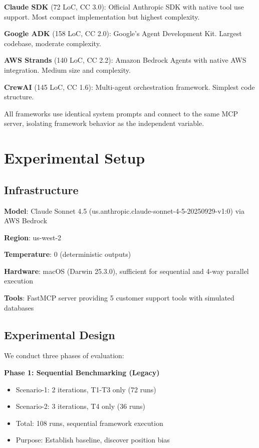 \documentclass[sigconf,nonacm]{acmart}
\begin{document}
\textbf{Claude SDK} (72 LoC, CC 3.0): Official Anthropic SDK with native tool use support. Most compact implementation but highest complexity.

\textbf{Google ADK} (158 LoC, CC 2.0): Google's Agent Development Kit. Largest codebase, moderate complexity.

\textbf{AWS Strands} (140 LoC, CC 2.2): Amazon Bedrock Agents with native AWS integration. Medium size and complexity.

\textbf{CrewAI} (145 LoC, CC 1.6): Multi-agent orchestration framework. Simplest code structure.

All frameworks use identical system prompts and connect to the same MCP server, isolating framework behavior as the independent variable.

\section{Experimental Setup}

\subsection{Infrastructure}

\textbf{Model}: Claude Sonnet 4.5 (us.anthropic.claude-sonnet-4-5-20250929-v1:0) via AWS Bedrock

\textbf{Region}: us-west-2

\textbf{Temperature}: 0 (deterministic outputs)

\textbf{Hardware}: macOS (Darwin 25.3.0), sufficient for sequential and 4-way parallel execution

\textbf{Tools}: FastMCP server providing 5 customer support tools with simulated databases

\subsection{Experimental Design}

We conduct three phases of evaluation:

\textbf{Phase 1: Sequential Benchmarking (Legacy)}
\begin{itemize}
\item Scenario-1: 2 iterations, T1-T3 only (72 runs)
\item Scenario-2: 3 iterations, T4 only (36 runs)
\item Total: 108 runs, sequential framework execution
\item Purpose: Establish baseline, discover position bias
\end{itemize}
\end{document}
